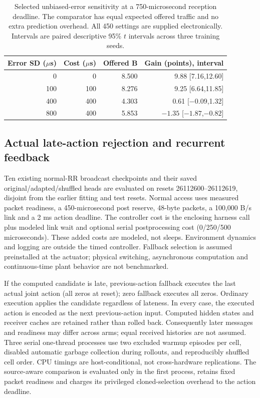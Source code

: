 \documentclass[pdflatex,sn-mathphys-num]{sn-jnl}
\begin{document}
\begin{table}[htbp]\centering
\caption{Selected unbiased-error sensitivity at a 750-microsecond reception deadline. The comparator has equal expected offered traffic and no extra prediction overhead. All 450 settings are supplied electronically. Intervals are paired descriptive 95\% $t$ intervals across three training seeds.}\label{tab:uncertain_readiness}
\begin{tabular}{rrrr}\toprule
Error SD ($\mu$s) & Cost ($\mu$s) & Offered B & Gain (points), interval\\\midrule
0 & 0 & 8.500 & 9.88 [7.16,12.60]\\
100 & 100 & 8.276 & 9.25 [6.64,11.85]\\
400 & 400 & 4.303 & 0.61 [$-0.09$,1.32]\\
800 & 400 & 5.853 & $-1.35$ [$-1.87$,$-0.82$]\\\bottomrule
\end{tabular}
\end{table}

\subsection{Actual late-action rejection and recurrent feedback}
Ten existing normal-RR broadcast checkpoints and their saved original/adapted/shuffled heads are evaluated on resets 26112600--26112619, disjoint from the earlier fitting and test resets. Normal access uses measured packet readiness, a 450-microsecond post reserve, 48-byte packets, a 100,000 B/s link and a 2 ms action deadline. The controller cost is the enclosing harness call plus modeled link wait and optional serial postprocessing cost (0/250/500 microseconds). These added costs are modeled, not sleeps. Environment dynamics and logging are outside the timed controller. Fallback selection is assumed preinstalled at the actuator; physical switching, asynchronous computation and continuous-time plant behavior are not benchmarked.

If the computed candidate is late, previous-action fallback executes the last actual joint action (all zeros at reset); zero fallback executes all zeros. Ordinary execution applies the candidate regardless of lateness. In every case, the executed action is encoded as the next previous-action input. Computed hidden states and receiver caches are retained rather than rolled back. Consequently later messages and readiness may differ across arms; equal received histories are not assumed. Three serial one-thread processes use two excluded warmup episodes per cell, disabled automatic garbage collection during rollouts, and reproducibly shuffled cell order. CPU timings are host-conditional, not cross-hardware replications. The source-aware comparison is evaluated only in the first process, retains fixed packet readiness and charges its privileged cloned-selection overhead to the action deadline.
\end{document}
